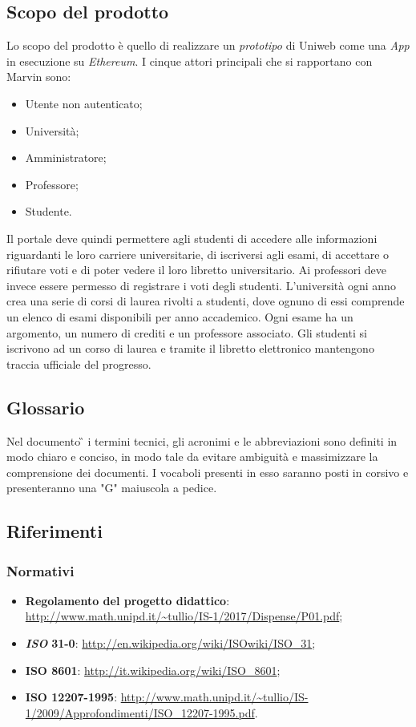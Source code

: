 \subsection{Scopo del prodotto}
Lo scopo del prodotto è quello di realizzare un \emph{prototipo} di Uniweb come una \emph{\DJ App} in esecuzione su \emph{Ethereum}. I cinque attori principali che si rapportano con Marvin sono:
\begin{itemize}
	\item Utente non autenticato; 
	\item Università;
	\item Amministratore;
	\item Professore;
	\item Studente.
\end{itemize} 
Il portale deve quindi permettere agli studenti di accedere alle informazioni riguardanti le loro carriere universitarie, di iscriversi agli esami, di accettare o rifiutare voti e di poter vedere il loro libretto universitario.
Ai professori deve invece essere permesso di registrare i voti degli studenti.
L'università ogni anno crea una serie di corsi di laurea rivolti a studenti, dove ognuno di essi comprende un elenco di esami disponibili per anno accademico. Ogni esame ha un argomento, un numero di crediti e un professore associato. Gli studenti si iscrivono ad un corso di laurea e tramite il libretto elettronico mantengono traccia ufficiale del progresso.

\subsection{Glossario}
Nel documento \G{} i termini tecnici, gli acronimi e le abbreviazioni sono definiti in modo chiaro e conciso, in modo tale da evitare ambiguità e massimizzare la comprensione dei documenti.
\newline I vocaboli presenti in esso saranno posti in corsivo e presenteranno una "G" maiuscola a pedice.
\subsection{Riferimenti}
\subsubsection{Normativi}
\begin{itemize}
	\item
	\textbf{Regolamento del progetto didattico}:
	\url{http://www.math.unipd.it/~tullio/IS-1/2017/Dispense/P01.pdf};
	\item
	\textbf{\textit{ISO}} \textbf{31-0}: \url{http://en.wikipedia.org/wiki/ISOwiki/ISO\_31};
	\item
	\textbf{ISO 8601}: \url{http://it.wikipedia.org/wiki/ISO\_8601};
	\item
	\textbf{ISO 12207-1995}: \url{http://www.math.unipd.it/~tullio/IS-1/2009/Approfondimenti/ISO\_12207-1995.pdf}.
\end{itemize}
